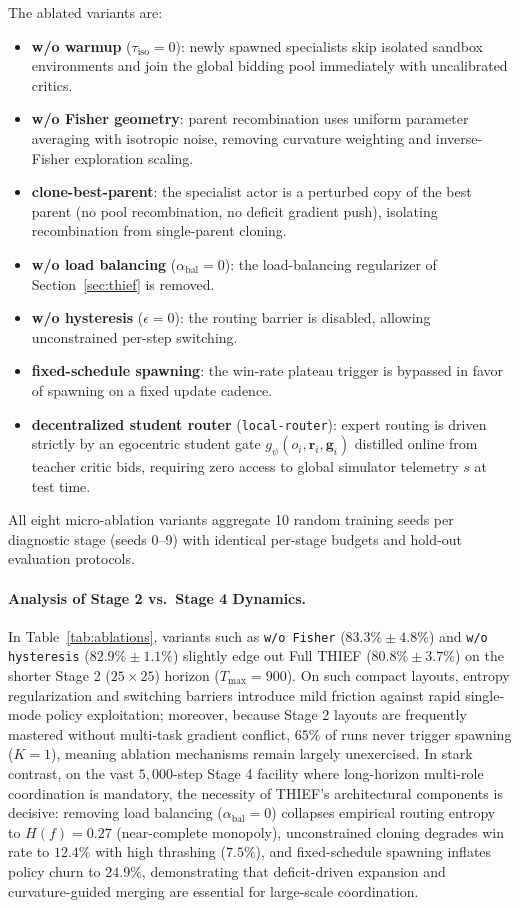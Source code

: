 The ablated variants are:
\begin{itemize}[leftmargin=*,nosep]
    \item \textbf{w/o warmup} ($\tau_{\text{iso}}=0$): newly spawned specialists skip isolated sandbox environments and join the global bidding pool immediately with uncalibrated critics.
    \item \textbf{w/o Fisher geometry}: parent recombination uses uniform parameter averaging with isotropic noise, removing curvature weighting and inverse-Fisher exploration scaling.
    \item \textbf{clone-best-parent}: the specialist actor is a perturbed copy of the best parent (no pool recombination, no deficit gradient push), isolating recombination from single-parent cloning.
    \item \textbf{w/o load balancing} ($\alpha_{\text{bal}}=0$): the load-balancing regularizer of Section~\ref{sec:thief} is removed.
    \item \textbf{w/o hysteresis} ($\epsilon=0$): the routing barrier is disabled, allowing unconstrained per-step switching.
    \item \textbf{fixed-schedule spawning}: the win-rate plateau trigger is bypassed in favor of spawning on a fixed update cadence.
    \item \textbf{decentralized student router} (\texttt{local-router}): expert routing is driven strictly by an egocentric student gate $g_\psi(o_i, \mathbf{r}_i, \mathbf{g}_i)$ distilled online from teacher critic bids, requiring zero access to global simulator telemetry $s$ at test time.
\end{itemize}
All eight micro-ablation variants aggregate 10 random training seeds per diagnostic stage (seeds 0--9) with identical per-stage budgets and hold-out evaluation protocols.

\paragraph{Analysis of Stage 2 vs.\ Stage 4 Dynamics.}
In Table~\ref{tab:ablations}, variants such as \texttt{w/o Fisher} ($83.3\% \pm 4.8\%$) and \texttt{w/o hysteresis} ($82.9\% \pm 1.1\%$) slightly edge out Full THIEF ($80.8\% \pm 3.7\%$) on the shorter Stage 2 ($25\times 25$) horizon ($T_{\max} = 900$). On such compact layouts, entropy regularization and switching barriers introduce mild friction against rapid single-mode policy exploitation; moreover, because Stage 2 layouts are frequently mastered without multi-task gradient conflict, $65\%$ of runs never trigger spawning ($K = 1$), meaning ablation mechanisms remain largely unexercised. In stark contrast, on the vast $5,000$-step Stage 4 facility where long-horizon multi-role coordination is mandatory, the necessity of THIEF's architectural components is decisive: removing load balancing ($\alpha_{\text{bal}}=0$) collapses empirical routing entropy to $H(f) = 0.27$ (near-complete monopoly), unconstrained cloning degrades win rate to $12.4\%$ with high thrashing ($7.5\%$), and fixed-schedule spawning inflates policy churn to $24.9\%$, demonstrating that deficit-driven expansion and curvature-guided merging are essential for large-scale coordination.

